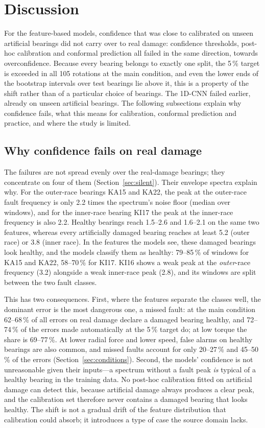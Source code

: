 \section{Discussion}
\label{sec:discussion}

For the feature-based models, confidence that was close to calibrated on unseen artificial bearings did not carry over
to real damage: confidence thresholds, post-hoc calibration and conformal prediction all failed in the same direction,
towards overconfidence. Because every bearing belongs to exactly one split, the 5\,\% target is exceeded in all 105
rotations at the main condition, and even the lower ends of the bootstrap intervals over test bearings lie above it,
this is a property of the shift rather than of a particular choice of bearings. The 1D-CNN failed earlier, already on
unseen artificial bearings. The following subsections explain why confidence fails, what this means for calibration,
conformal prediction and practice, and where the study is limited.

\subsection{Why confidence fails on real damage}

The failures are not spread evenly over the real-damage bearings; they concentrate on four of them
(Section~\ref{sec:silent}). Their envelope spectra explain why. For the outer-race bearings KA15 and KA22, the peak at
the outer-race fault frequency is only 2.2 times the spectrum's noise floor (median over windows), and for the
inner-race bearing KI17 the peak at the inner-race frequency is also 2.2. Healthy bearings reach 1.5--2.6 and
1.6--2.1 on the same two features, whereas every artificially damaged bearing reaches at least 5.2 (outer race) or
3.8 (inner race). In the features the models see, these damaged bearings look healthy, and the models classify them
as healthy: 79--85\,\% of windows for KA15 and KA22, 58--70\,\% for KI17. KI16 shows a weak peak at the
\emph{outer}-race frequency (3.2) alongside a weak inner-race peak (2.8), and its windows are split between the two
fault classes.

This has two consequences. First, where the features separate the classes well, the dominant error is the most
dangerous one, a missed fault: at the main condition 62--68\,\% of all errors on real damage declare a damaged
bearing healthy, and 72--74\,\% of the errors made automatically at the 5\,\% target do; at low torque the share is
69--77\,\%. At lower radial force and lower speed, false alarms on healthy bearings are also common, and missed faults
account for only 20--27\,\% and 45--50\,\% of the errors (Section~\ref{sec:conditions}). Second, the models' confidence is not unreasonable given their inputs---a
spectrum without a fault peak \emph{is} typical of a healthy bearing in the training data. No post-hoc calibration
fitted on artificial damage can detect this, because artificial damage always produces a clear peak, and the
calibration set therefore never contains a damaged bearing that looks healthy. The shift is not a gradual drift of
the feature distribution that calibration could absorb; it introduces a type of case the source domain lacks.

